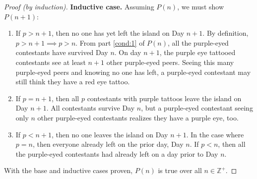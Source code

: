 \documentclass[a4paper]{article}
\newcommand{\CheckedBox}{\mbox{\ooalign{$\checkmark$\cr\hidewidth$\square$\hidewidth\cr}}\hspace{5pt}}
\begin{document}
\begin{proof}[Proof (by induction)]
	\textbf{Inductive case.} Assuming $P(n)$, we must show $P(n+1)$:
	\begin{enumerate}
		\item \CheckedBox If $p > n + 1$, then no one has yet left the island on Day $n+1$. By
			definition, $p > n+1 \implies p > n$. From part \ref{cond:1} of $P(n)$,
			all the purple-eyed contestants have survived Day $n$. On day $n + 1$,
			the purple eye tattooed contestants see at least $n + 1$ other
			purple-eyed peers. Seeing this many purple-eyed peers and knowing no one
			has left, a purple-eyed contestant may still think they have a red eye
			tattoo.
		\item \CheckedBox If $p = n + 1$, then all $p$ contestants with purple
			tattoos leave the island on Day $n+1$. All contestants survive Day $n$, but a
			purple-eyed contestant seeing only $n$ other purple-eyed contestants
			realizes they have a purple eye, too.
		\item \CheckedBox If $p < n + 1$, then no one leaves the island on Day $n + 1$. In the
			case where $p = n$, then everyone already left on the prior day, Day $n$.
			If $p < n$, then all the purple-eyed contestants had already left on a
			day prior to Day $n$. 
\end{enumerate}


	With the base and inductive cases proven, $P(n)$ is true over all $n \in
	\mathbb{Z}^{+}$.

\end{proof}
\end{document}

